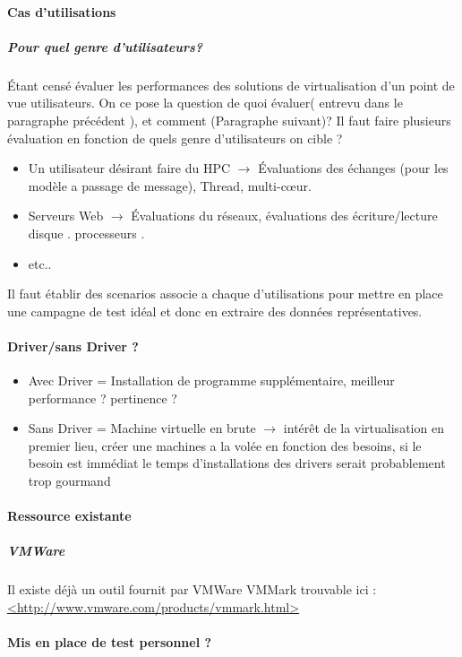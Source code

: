\documentclass[french]{article}
\begin{document}
\paragraph{Cas d'utilisations}
\subparagraph{Pour quel genre d'utilisateurs?}
Étant censé évaluer les performances des solutions de virtualisation d'un point de vue utilisateurs.
On ce pose la question de quoi évaluer( entrevu dans le paragraphe précédent  ), et comment (Paragraphe suivant)? Il faut faire plusieurs évaluation en fonction de quels genre d'utilisateurs on cible ? 
\begin{itemize}
	\item Un utilisateur désirant faire du HPC $\rightarrow$ Évaluations des échanges (pour les modèle a passage de message), Thread, multi-cœur.
	\item Serveurs Web $\rightarrow$ Évaluations du réseaux, évaluations des écriture/lecture disque . processeurs .
	\item etc.. 
\end{itemize}
Il faut établir des scenarios associe a chaque d'utilisations pour mettre en place une campagne de test idéal et donc en extraire des données représentatives. 
\paragraph{Driver/sans Driver ? }
\begin{itemize}
	\item Avec Driver = Installation de programme supplémentaire, meilleur performance ? pertinence ? 
	\item Sans Driver = Machine virtuelle en brute $\rightarrow$ intérêt de la virtualisation en premier lieu, créer une machines a la volée en fonction des besoins, si le besoin est immédiat le temps d'installations des drivers serait probablement trop gourmand  
\end{itemize}
\paragraph{Ressource existante }
\subparagraph{VMWare}
	Il existe déjà un outil fournit par VMWare VMMark trouvable ici : \newline
	\url{<http://www.vmware.com/products/vmmark.html>}
\paragraph{Mis en place de test personnel ?}
\end{document}
